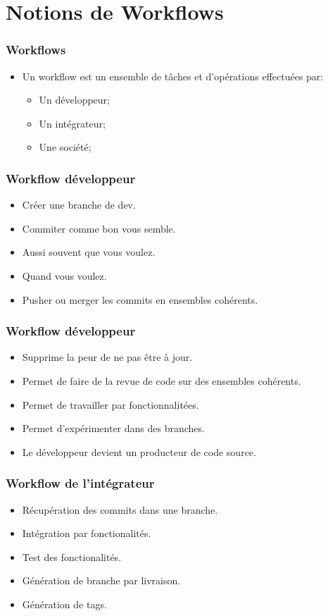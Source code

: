 \documentclass{beamer}
\begin{document}
    \section{Notions de Workflows}
    \begin{frame}
      \frametitle{Workflows}
      \begin{itemize}
        \item Un workflow est un ensemble de tâches et d'opérations effectuées par:
          \begin{itemize}
            \item Un développeur;
            \item Un intégrateur;
            \item Une société;
          \end{itemize}
      \end{itemize}
    \end{frame}
    \begin{frame}
      \frametitle{Workflow développeur}
      \begin{itemize}
        \item Créer une branche de dev.
        \item Commiter comme bon vous semble.
        \item Aussi souvent que vous voulez.
        \item Quand vous voulez.
        \item Pusher ou merger les commits en ensembles cohérents.
      \end{itemize}
    \end{frame}

    \begin{frame}
      \frametitle{Workflow développeur}
      \begin{itemize}
        \item Supprime la peur de ne pas être à jour.
        \item Permet de faire de la revue de code sur des ensembles cohérents.
        \item Permet de travailler par fonctionnalitées.
        \item Permet d'expérimenter dans des branches.
        \item Le développeur devient un producteur de code source.
      \end{itemize}
    \end{frame}

    \begin{frame}
      \frametitle{Workflow de l'intégrateur}
      \begin{itemize}
        \item Récupération des commits dans une branche.
        \item Intégration par fonctionalités.
        \item Test des fonctionalités.
        \item Génération de branche par livraison.
        \item Génération de tags.
      \end{itemize}
    \end{frame}
\end{document}
